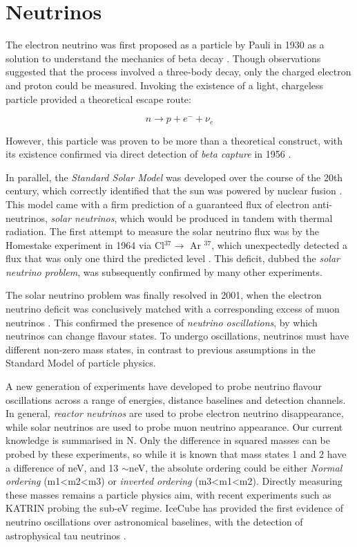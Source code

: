 \section{Neutrinos}

The electron neutrino was first proposed as a particle by Pauli in 1930 as a solution to understand the mechanics of beta decay . Though observations suggested that the process involved a three-body decay, only the charged electron and proton could be measured. Invoking the existence of a light, chargeless particle provided a theoretical escape route:

\begin{equation}
	n \rightarrow p + e^{-} + \nu_{e}
\end{equation}

 However, this particle was proven to be more than a theoretical construct, with its existence confirmed via direct detection of \emph{beta capture} in 1956 .

In parallel, the \emph{Standard Solar Model} was developed over the course of the 20th century, which correctly identified that the sun was powered by nuclear fusion . This model came with a firm prediction of a guaranteed flux of electron anti-neutrinos, \emph{solar neutrinos}, which would be produced in tandem with thermal radiation. The first attempt to measure the solar neutrino flux was by the Homestake experiment in 1964 via Cl$^{37} \rightarrow$ Ar $^{37}$, which unexpectedly detected a flux that was only one third the predicted level . This deficit, dubbed the \emph{solar neutrino problem}, was subsequently confirmed by many other experiments.

The solar neutrino problem was finally resolved in 2001, when the electron neutrino deficit was conclusively matched with a corresponding excess of muon neutrinos . This confirmed the presence of \emph{neutrino oscillations}, by which neutrinos can change flavour states. To undergo oscillations, neutrinos must have different non-zero mass states, in contrast to previous assumptions in the Standard Model of particle physics. 

A new generation of experiments have developed to probe neutrino flavour oscillations across a range of energies, distance baselines and detection channels. In general, \emph{reactor neutrinos} are used to probe electron neutrino disappearance, while solar neutrinos are used to probe muon neutrino appearance. Our current knowledge is summarised in N. Only the difference in squared masses can be probed by these experiments, so while it is known that mass states 1 and 2 have a difference of neV, and 13 $\sim$neV, the absolute ordering could be either \emph{Normal ordering} (m1<m2<m3) or \emph{inverted ordering} (m3<m1<m2). Directly measuring these masses remains a particle physics aim, with recent experiments such as KATRIN probing the sub-eV regime. IceCube has provided the first evidence of neutrino oscillations over astronomical baselines, with the detection of astrophysical tau neutrinos .

